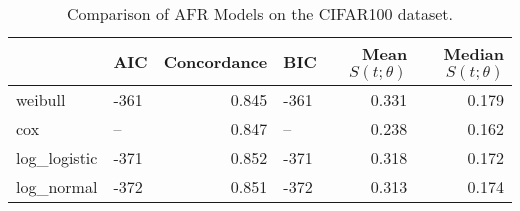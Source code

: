 \begin{table}
\caption{Comparison of AFR Models on the CIFAR100 dataset.}
\label{tab:cifar100}
\begin{tabular}{llrlrr}
\toprule
 & AIC & Concordance & BIC & Mean $S(t;\theta)$ & Median $S(t;\theta)$ \\
\midrule
weibull & -361 & 0.845 & -361 & 0.331 & 0.179 \\
cox & -- & 0.847 & -- & 0.238 & 0.162 \\
log_logistic & -371 & 0.852 & -371 & 0.318 & 0.172 \\
log_normal & -372 & 0.851 & -372 & 0.313 & 0.174 \\
\bottomrule
\end{tabular}
\end{table}
